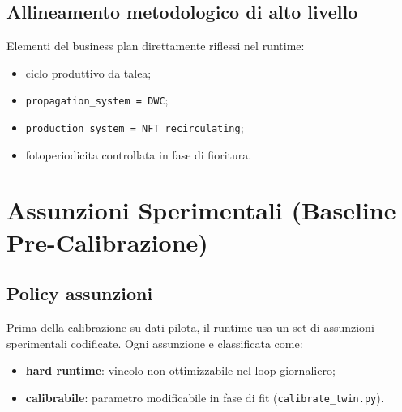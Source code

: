 ﻿\documentclass[11pt,a4paper]{report}
\begin{document}
\section{Allineamento metodologico di alto livello}
Elementi del business plan direttamente riflessi nel runtime:
\begin{itemize}
  \item ciclo produttivo da talea;
  \item \texttt{propagation\_system = DWC};
  \item \texttt{production\_system = NFT\_recirculating};
  \item fotoperiodicita controllata in fase di fioritura.
\end{itemize}

\newpage
\chapter{Assunzioni Sperimentali (Baseline Pre-Calibrazione)}
\label{chap:assunzioni_sperimentali}

\section{Policy assunzioni}
Prima della calibrazione su dati pilota, il runtime usa un set di assunzioni sperimentali codificate.
Ogni assunzione e classificata come:
\begin{itemize}
  \item \textbf{hard runtime}: vincolo non ottimizzabile nel loop giornaliero;
  \item \textbf{calibrabile}: parametro modificabile in fase di fit (\texttt{calibrate\_twin.py}).
\end{itemize}
\end{document}
